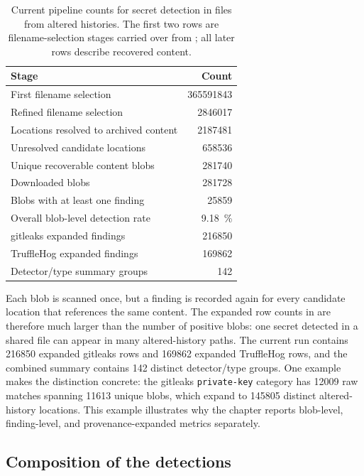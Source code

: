 \begin{table}[h]
\centering
\caption{Current pipeline counts for secret detection in files from altered histories. The first two rows are filename-selection stages carried over from ; all later rows describe recovered content.}
\label{tab:sec-current-run}
\small
\begin{tabular}{lr}
\hline
\textbf{Stage} & \textbf{Count} \\
\hline
First filename selection & \num{365591843} \\
Refined filename selection & \num{2846017} \\
\hline
Locations resolved to archived content & \num{2187481} \\
Unresolved candidate locations & \num{658536} \\
Unique recoverable content blobs & \num{281740} \\
Downloaded blobs & \num{281728} \\
Blobs with at least one finding & \num{25859} \\
Overall blob-level detection rate & \SI{9.18}{\percent} \\
gitleaks expanded findings & \num{216850} \\
TruffleHog expanded findings & \num{169862} \\
Detector/type summary groups & \num{142} \\
\hline
\end{tabular}
\end{table}

Each blob is scanned once, but a finding is recorded again for every candidate location that references the same content.
The expanded row counts in  are therefore much larger than the number of positive blobs: one secret detected in a shared file can appear in many altered-history paths.
The current run contains \num{216850} expanded gitleaks rows and \num{169862} expanded TruffleHog rows, and the combined summary contains \num{142} distinct detector/type groups.
One example makes the distinction concrete: the gitleaks \texttt{private-key} category has \num{12009} raw matches spanning \num{11613} unique blobs, which expand to \num{145805} distinct altered-history locations.
This example illustrates why the chapter reports blob-level, finding-level, and provenance-expanded metrics separately.

\subsection{Composition of the detections}

